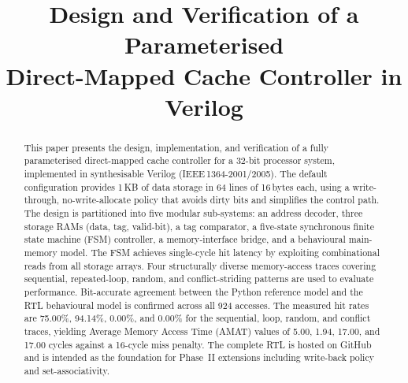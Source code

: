 \documentclass[conference]{IEEEtran}
\renewcommand{\_}{\textunderscore\allowbreak{}}
\begin{document}
\title{Design and Verification of a Parameterised\\
       Direct-Mapped Cache Controller in Verilog}

\author{%
  \and
  \and
  \and
  \and
}

\maketitle

\begin{abstract}
This paper presents the design, implementation, and verification of a
fully parameterised direct-mapped cache controller for a 32-bit processor
system, implemented in synthesisable Verilog (IEEE\,1364-2001/2005). The
default configuration provides 1\,KB of data storage in 64 lines of
16\,bytes each, using a write-through, no-write-allocate policy that avoids
dirty bits and simplifies the control path. The design is partitioned into
five modular sub-systems: an address decoder, three storage RAMs (data, tag,
valid-bit), a tag comparator, a five-state synchronous finite state machine
(FSM) controller, a memory-interface bridge, and a behavioural main-memory
model. The FSM achieves single-cycle hit latency by exploiting combinational
reads from all storage arrays. Four structurally diverse memory-access traces
covering sequential, repeated-loop, random, and conflict-striding patterns are
used to evaluate performance. Bit-accurate agreement between the Python
reference model and the RTL behavioural model is confirmed across all 924
accesses. The measured hit rates are 75.00\%, 94.14\%, 0.00\%, and 0.00\%
for the sequential, loop, random, and conflict traces, yielding Average Memory
Access Time (AMAT) values of 5.00, 1.94, 17.00, and 17.00 cycles against a
16-cycle miss penalty. The complete RTL is hosted on GitHub and is intended
as the foundation for Phase~II extensions including write-back policy and
set-associativity.
\end{abstract}
\end{document}
